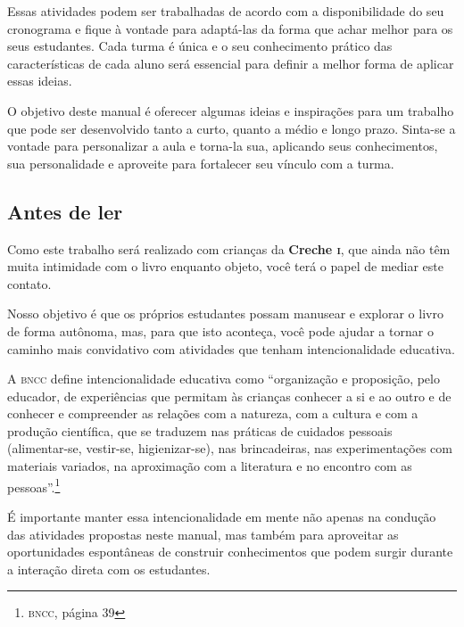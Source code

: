 \documentclass[11pt]{extarticle}
\begin{document}
Essas atividades podem ser trabalhadas de acordo com a 
disponibilidade do seu cronograma e fique à vontade para adaptá-las 
da forma que achar melhor para os seus estudantes. Cada turma é única 
e o seu conhecimento prático das características de cada aluno será 
essencial para definir a melhor forma de aplicar essas ideias. 

O objetivo deste manual é oferecer algumas ideias 
e inspirações para um trabalho que pode ser desenvolvido tanto 
a curto, quanto a médio e longo prazo. Sinta-se a vontade para 
personalizar a aula e torna-la sua, aplicando seus conhecimentos, sua 
personalidade e aproveite para fortalecer 
seu vínculo com a turma.


\subsection{Antes de ler}


Como este trabalho será realizado com crianças da \textbf{Creche \textsc{i}}, 
que ainda não têm muita intimidade com o livro enquanto objeto, você terá o 
papel de mediar este contato. 

Nosso objetivo é que os próprios estudantes possam manusear 
e explorar o livro de forma autônoma, mas, para que isto aconteça, você 
pode ajudar a tornar o caminho mais convidativo com atividades que tenham 
intencionalidade educativa. 

A \textsc{bncc} define intencionalidade educativa como ``organização 
e proposição, pelo educador, de experiências que permitam às crianças 
conhecer a si e ao outro e de conhecer e compreender as relações com a 
natureza, com a cultura e com a produção científica, que se traduzem nas 
práticas de cuidados pessoais (alimentar-se, vestir-se, higienizar-se), 
nas brincadeiras, nas experimentações com materiais 
variados, na aproximação com a literatura e no encontro com as 
pessoas''.\footnote{\textsc{bncc}, página 39}

É importante manter essa intencionalidade em mente não apenas na condução 
das atividades propostas neste manual, mas também para aproveitar as 
oportunidades espontâneas de construir conhecimentos que podem surgir durante 
a interação direta com os estudantes.
\end{document}
